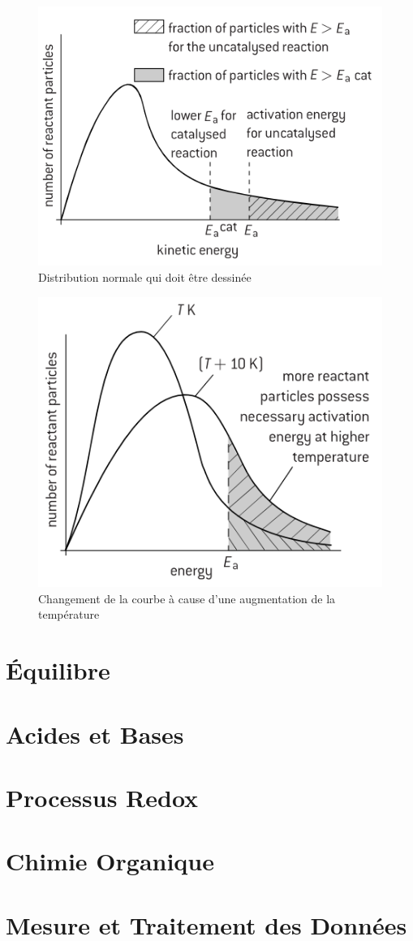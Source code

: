 \documentclass[french, a4paper, 12pt]{article}
\begin{document}
\begin{figure}[H]
\centering
\includegraphics[scale=0.8]{maxwell-boltzmann}
\caption{Distribution normale qui doit être dessinée}
\end{figure}

\begin{figure}[H]
\centering
\includegraphics[scale=0.8]{maxwell-boltzmann_temperature}
\caption{Changement de la courbe à cause d'une augmentation de la température}
\end{figure}
\pagebreak

\section{Équilibre}
\pagebreak

\section{Acides et Bases}
\pagebreak

\section{Processus Redox}
\pagebreak

\section{Chimie Organique}
\pagebreak

\section{Mesure et Traitement des Données}
\pagebreak
\end{document}
